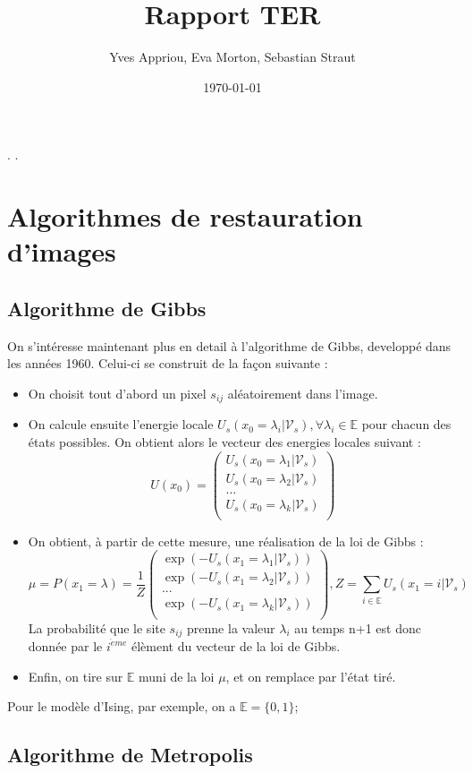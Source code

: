 \documentclass[a4paper, 12pt]{article}
\title{Rapport TER}
\author{Yves Appriou, Eva Morton, Sebastian Straut}
\date{\today}
\begin{document}
\maketitle

\tableofcontents.
\newpage.
\section{Algorithmes de restauration d'images}
\subsection[Algorithme de Gibbs]{Algorithme de Gibbs}
On s'intéresse maintenant plus en detail à l'algorithme de Gibbs, developpé dans les années 1960. Celui-ci se construit de la façon suivante : 
\begin{itemize}
\item On choisit tout d'abord un pixel $s_{ij} $ aléatoirement dans l'image.
\item On calcule ensuite l'energie locale $U_s(x_0=\lambda_i| \mathcal{V}_s), \forall \lambda_i \in \mathbb{E}  $ pour chacun des états possibles. On obtient alors le vecteur des energies locales suivant : 
\[
  U(x_0) = \left(
          \begin{array}{ll}
            U_s(x_0=\lambda_1| \mathcal{V}_s) \\
            U_s(x_0=\lambda_2| \mathcal{V}_s) \\
            ...\\
            U_s(x_0=\lambda_k| \mathcal{V}_s) \\
          \end{array}
        \right)
\]
\item On obtient, à partir de cette mesure, une réalisation de la loi de Gibbs : 
\[
  \mu = P(x_1 = \lambda) = \frac{1}{Z} \left(
          \begin{array}{ll}
            \exp(-U_s(x_1=\lambda_1| \mathcal{V}_s)) \\
            \exp(-U_s(x_1=\lambda_2| \mathcal{V}_s)) \\
            ...\\
            \exp(-U_s(x_1=\lambda_k| \mathcal{V}_s)) \\
          \end{array}
        \right)
        , Z= \sum_{i\in \mathbb{E}} {U_s(x_1=i | \mathcal{V}_s)}
\]
La probabilité que le site $s_{ij}$ prenne la valeur $\lambda_i$ au temps n+1 est donc donnée par le $i^{\grave{e}me}$ élèment du vecteur de la loi de Gibbs.
\item Enfin, on tire sur $\mathbb{E}$ muni de la loi $\mu$, et on remplace par l'état tiré.
\end{itemize}
Pour le modèle d'Ising, par exemple, on a $\mathbb{E} =\{0,1\}$;

\subsection[Algorithme de Metropolis]{Algorithme de Metropolis}
\end{document}
